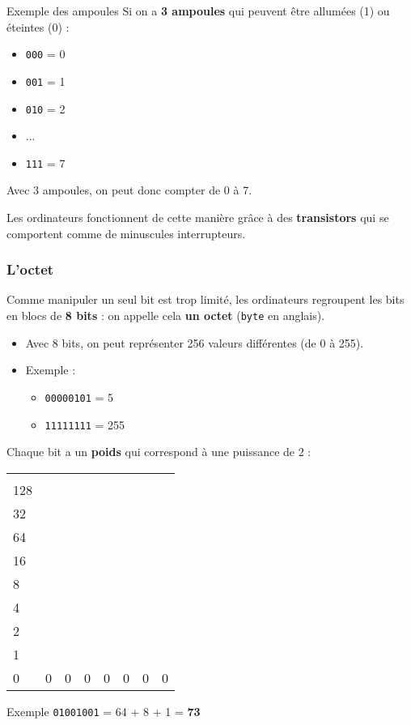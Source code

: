\begin{UPSTIinfor}{Exemple des ampoules}
	Si on a \textbf{3 ampoules} qui peuvent être allumées (1) ou éteintes (0) :
	\begin{itemize}
		\item \texttt{000} = 0
		\item \texttt{001} = 1
		\item \texttt{010} = 2
		\item ...
		\item \texttt{111} = 7
	\end{itemize}

	Avec 3 ampoules, on peut donc compter de 0 à 7.
\end{UPSTIinfor}

Les ordinateurs fonctionnent de cette manière grâce à des \textbf{transistors} qui se comportent comme de minuscules interrupteurs.

\subsubsection{L’octet}

Comme manipuler un seul bit est trop limité, les ordinateurs regroupent les bits en blocs de \textbf{8 bits} :
on appelle cela \textbf{un octet} (\texttt{byte} en anglais).

\begin{itemize}
	\item Avec 8 bits, on peut représenter 256 valeurs différentes (de 0 à 255).
	\item Exemple :
	      \begin{itemize}
		      \item \texttt{00000101} = 5
		      \item \texttt{11111111} = 255
	      \end{itemize}
\end{itemize}

Chaque bit a un \textbf{poids} qui correspond à une puissance de 2 :

\begin{center}
	\begin{tabular}{|l|l|l|l|l|l|l|l|}
		\hline
		\makecell[tl]{$2^{7}$         \\ 128} & \makecell[tl]{$2^{6}$\\  32} & \makecell[tl]{$2^{5}$\\ 64} & \makecell[tl]{$2^{4}$\\ 16} & \makecell[tl]{$2^{3}$\\ 8} & \makecell[tl]{$2^{2}$ \\ 4} & \makecell[tl]{$2^{1}$\\ 2} & \makecell[tl]{$2^{0}$ \\1} \\
		\hline
		0 & 0 & 0 & 0 & 0 & 0 & 0 & 0 \\
		\hline
	\end{tabular}
\end{center}
\begin{UPSTIinfor}{Exemple}
	\texttt{01001001} = 64 + 8 + 1 = \textbf{73}
\end{UPSTIinfor}

